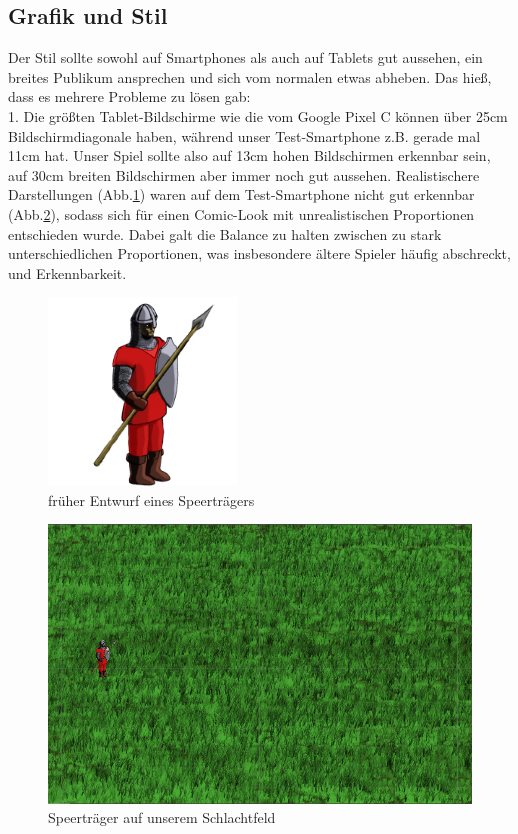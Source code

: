 \documentclass[extern,palatino]{cgBA}
\begin{document}
\subsection{Grafik und Stil}
Der Stil sollte sowohl auf Smartphones als auch auf Tablets gut aussehen, ein breites Publikum ansprechen und sich vom normalen etwas abheben. Das hieß, dass es mehrere Probleme zu lösen gab:
\\1. Die größten Tablet-Bildschirme wie die vom Google Pixel C können über 25cm Bildschirmdiagonale haben, während unser Test-Smartphone z.B. gerade mal 11cm hat. Unser Spiel sollte also auf 13cm hohen Bildschirmen erkennbar sein, auf 30cm breiten Bildschirmen aber immer noch gut aussehen. Realistischere Darstellungen (Abb.\ref{speerträger}) waren auf dem Test-Smartphone  nicht gut erkennbar (Abb.\ref{speerkarte}), sodass sich für einen Comic-Look mit unrealistischen Proportionen entschieden wurde. Dabei galt die Balance zu halten zwischen zu stark unterschiedlichen Proportionen, was insbesondere ältere Spieler häufig abschreckt, und Erkennbarkeit.
\begin{figure}[H]
		\centering
		\includegraphics[height=5cm]{soldier.png}
		\caption{früher Entwurf eines Speerträgers}
		\label{speerträger}
\end{figure}
\begin{figure}[H]
		\centering
		\includegraphics[width=13cm]{soldierbackground.png}
		\caption{Speerträger auf unserem Schlachtfeld}
		\label{speerkarte}
\end{figure}
\end{document}
